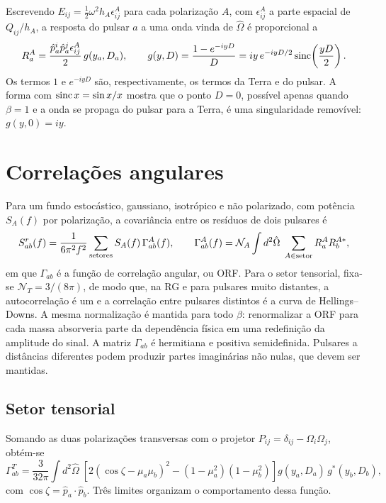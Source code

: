 Escrevendo $E_{ij}=\frac12\omega^2h_A\epsilon^A_{ij}$ para cada
polarização $A$, com $\epsilon^A_{ij}$ a parte espacial de
$Q_{ij}/h_A$, a resposta do pulsar $a$ a uma onda vinda de $\hat\Omega$
é proporcional a
\begin{equation}
 R_a^A=\frac{\hat p_a^i\hat p_a^j\epsilon^A_{ij}}{2}\,g(y_a,D_a),
 \qquad
 g(y,D)=\frac{1-e^{-iyD}}{D}
 =iy\,e^{-iyD/2}\operatorname{sinc}\!\left(\frac{yD}{2}\right).
 \label{eq:pta-resposta}
\end{equation}
Os termos $1$ e $e^{-iyD}$ são, respectivamente, os termos da Terra e do
pulsar. A forma com $\operatorname{sinc} x=\sin x/x$ mostra que o ponto $D=0$,
possível apenas quando $\beta=1$ e a onda se propaga do pulsar para a
Terra, é uma singularidade removível: $g(y,0)=iy$.

\section{Correlações angulares}

Para um fundo estocástico, gaussiano, isotrópico e não polarizado, com
potência $S_A(f)$ por polarização, a covariância entre os resíduos de
dois pulsares é
\begin{equation}
 S^r_{ab}(f)=\frac{1}{6\pi^2f^2}\sum_{\rm setores}S_A(f)\,\Gamma^A_{ab}(f),
 \qquad
 \Gamma^A_{ab}(f)=\mathcal N_A\int d^2\hat\Omega\;
 \sum_{A\in\text{setor}}R_a^AR_b^{A*},
 \label{eq:pta-orf}
\end{equation}
em que $\Gamma_{ab}$ é a função de correlação angular, ou ORF. Para o
setor tensorial, fixa-se $\mathcal N_T=3/(8\pi)$, de modo que, na RG e
para pulsares muito distantes, a autocorrelação é um e a correlação
entre pulsares distintos é a curva de Hellings--Downs. A mesma
normalização é mantida para todo $\beta$: renormalizar a ORF para cada
massa absorveria parte da dependência física em uma redefinição da
amplitude do sinal. A matriz $\Gamma_{ab}$ é hermitiana e positiva
semidefinida. Pulsares a distâncias diferentes podem produzir partes
imaginárias não nulas, que devem ser mantidas.

\subsection{Setor tensorial}

Somando as duas polarizações transversas com o projetor
$P_{ij}=\delta_{ij}-\Omega_i\Omega_j$, obtém-se
\begin{equation}
 \Gamma^T_{ab}=\frac{3}{32\pi}\int d^2\hat\Omega\;
 \left[2(\cos\zeta-\mu_a\mu_b)^2-(1-\mu_a^2)(1-\mu_b^2)\right]
 g(y_a,D_a)\,g^*(y_b,D_b),
 \label{eq:pta-orf-tensorial}
\end{equation}
com $\cos\zeta=\hat p_a\cdot\hat p_b$. Três limites organizam o
comportamento dessa função.

